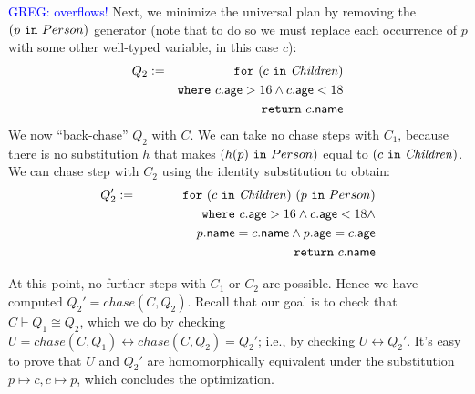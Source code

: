 \documentclass[preprint]{sigplanconf}
\newcommand{\FOR}{{\tt for} \ }
\newcommand{\WHERE}{{\tt where} \ }
\newcommand{\IN}{ \ {\tt in} \ }
\newcommand{\RETURN}{{\tt return} \ }
\newcommand{\greg}[1]{\textcolor{blue}{GREG: #1}}
\newcommand{\relation}[1]{\ensuremath{\mathit{#1}}\xspace}
\begin{document}
\greg{overflows!}
Next, we minimize the universal plan by removing the $(p \IN Person)$ generator (note that to do so we must replace each occurrence of $p$ with some other well-typed variable, in this case $c$):
\begin{eqnarray*}
Q_2 & := & \FOR (c \IN \relation{Children}) \\
 & & \WHERE c.{\sf age} > 16 \wedge c.{\sf age} < 18 \\
  & & \RETURN c.{\sf name}
\end{eqnarray*}  
We now ``back-chase'' $Q_2$ with $C$.  We can take no chase steps with $C_1$, because there is no substitution $h$ that makes $(h(p) \IN Person)$ equal to $(c \IN \relation{Children})$.  We can chase step with $C_2$ using the identity substitution to obtain:
\begin{eqnarray*}
Q_2' & := & \FOR (c \IN \relation{Children}) \ (p \IN Person) \\
 & & \WHERE c.{\sf age} > 16 \wedge c.{\sf age} < 18 \wedge \\
 & & \ \ \ \ \ \ \ \ \ \ \ \   p.{\sf name} = c.{\sf name} \wedge p.{\sf age} = c.{\sf age}\\
  & & \RETURN c.{\sf name}
\end{eqnarray*}  

At this point, no further steps with $C_1$ or $C_2$ are possible.
Hence we have computed $Q_2' = chase(C, Q_2)$.
Recall that our goal is to check that $C \vdash Q_1 \cong Q_2$, which we do by checking $U = chase(C, Q_1) \leftrightarrow chase(C, Q_2) = Q_2'$; i.e., by checking $U \leftrightarrow Q_2'$.
It's easy to prove that $U$ and $Q_2'$ are homomorphically equivalent under the substitution $p \mapsto c, c \mapsto p$, which concludes the optimization.
\end{document}
